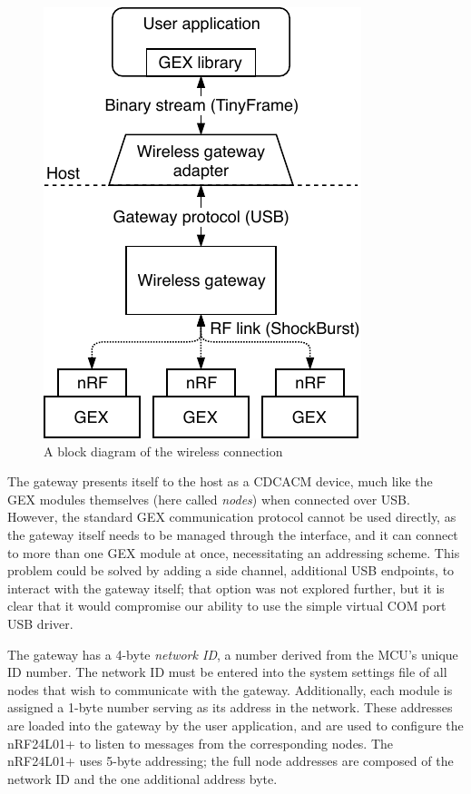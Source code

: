 \begin{figure}
	\vspace{-1em}
	\centering
	\includegraphics[scale=0.9]{img/rf-gw.pdf}
	\caption{A block diagram of the wireless connection}
\end{figure}

The gateway presents itself to the host as a \gls{CDCACM} device, much like the GEX modules themselves (here called \textit{nodes}) when connected over \gls{USB}. However, the standard GEX communication protocol cannot be used directly, as the gateway itself needs to be managed through the interface, and it can connect to more than one GEX module at once, necessitating an addressing scheme. This problem could be solved by adding a side channel, additional \gls{USB} endpoints, to interact with the gateway itself; that option was not explored further, but it is clear that it would compromise our ability to use the simple virtual COM port \gls{USB} driver. 


The gateway has a 4-byte \textit{network ID}, a number derived from the \gls{MCU}'s unique ID number. The network ID must be entered into the system settings file of all nodes that wish to communicate with the gateway. Additionally, each module is assigned a 1-byte number serving as its address in the network. These addresses are loaded into the gateway by the user application, and are used to configure the nRF24L01+ to listen to messages from the corresponding nodes. The nRF24L01+ uses 5-byte addressing; the full node addresses are composed of the network ID and the one additional address byte.

